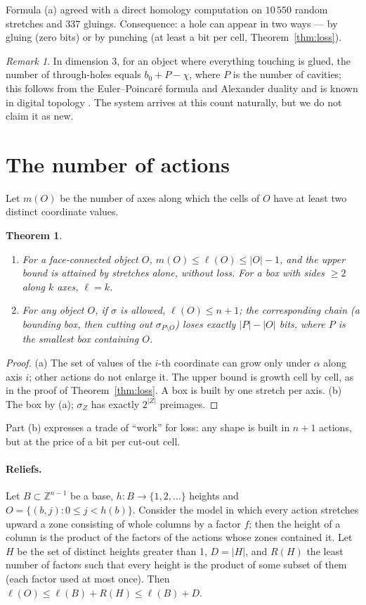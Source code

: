 \documentclass[11pt,a4paper]{article}
\theoremstyle{plain}
\newtheorem{theorem}{Theorem}
\theoremstyle{definition}
\theoremstyle{remark}
\newtheorem*{remark}{Remark}
\newcommand{\Z}{\mathbb{Z}}
\begin{document}
Formula (a) agreed with a direct homology computation on $10\,550$ random stretches and $337$ gluings. Consequence: a hole can appear in two ways — by gluing (zero bits) or by punching (at least a bit per cell, Theorem~\ref{thm:loss}).

\begin{remark}
In dimension 3, for an object where everything touching is glued, the number of through-holes equals $b_0+P-\chi$, where $P$ is the number of cavities; this follows from the Euler–Poincaré formula and Alexander duality and is known in digital topology \cite{toriwaki,kaczynski}. The system arrives at this count naturally, but we do not claim it as new.
\end{remark}

\section{The number of actions}\label{sec:count}

Let $m(O)$ be the number of axes along which the cells of $O$ have at least two distinct coordinate values.

\begin{theorem}\label{thm:bounds}
\begin{enumerate}[label=\upshape(\alph*)]
\item For a face-connected object $O$, $m(O)\le\ell(O)\le|O|-1$, and the upper bound is attained by stretches alone, without loss. For a box with sides $\ge2$ along $k$ axes, $\ell=k$.
\item For any object $O$, if $\sigma$ is allowed, $\ell(O)\le n+1$; the corresponding chain (a bounding box, then cutting out $\sigma_{P\setminus O}$) loses exactly $|P|-|O|$ bits, where $P$ is the smallest box containing $O$.
\end{enumerate}
\end{theorem}
\begin{proof}
(a) The set of values of the $i$-th coordinate can grow only under $\alpha$ along axis $i$; other actions do not enlarge it. The upper bound is growth cell by cell, as in the proof of Theorem~\ref{thm:loss}. A box is built by one stretch per axis. (b) The box by (a); $\sigma_Z$ has exactly $2^{|Z|}$ preimages.
\end{proof}

Part (b) expresses a trade of ``work'' for loss: any shape is built in $n+1$ actions, but at the price of a bit per cut-out cell.

\paragraph{Reliefs.} Let $B\subset\Z^{n-1}$ be a base, $h\colon B\to\{1,2,\dots\}$ heights and $O=\{(b,j):0\le j<h(b)\}$. Consider the model in which every action stretches upward a zone consisting of whole columns by a factor $f$; then the height of a column is the product of the factors of the actions whose zones contained it. Let $H$ be the set of distinct heights greater than 1, $D=|H|$, and $R(H)$ the least number of factors such that every height is the product of some subset of them (each factor used at most once). Then $\ell(O)\le \ell(B)+R(H)\le\ell(B)+D$.
\end{document}
